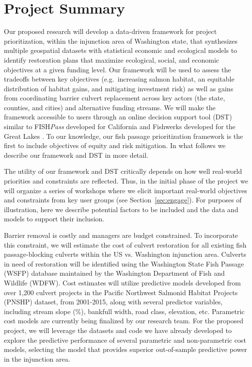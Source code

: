 \documentclass[12pt]{elsarticle}
\begin{document}
\section{Project Summary}\label{sec:summary} %

Our proposed research will develop a data-driven framework for project prioritization, within the injunction area of Washington state, that synthesizes multiple geospatial datasets with statistical economic and ecological models to identify restoration plans that maximize ecological, social, and economic objectives at a given funding level. Our framework will be used to assess the tradeoffs between key objectives (e.g.\ increasing salmon habitat, an equitable distribution of habitat gains, and mitigating investment risk) as well as gains from coordinating barrier culvert replacement across key actors (the state, counties, and cities) and alternative funding streams. We will make the framework accessible to users through an online decision support tool (DST) similar to FISH\emph{Pass} developed for California \citep{optipass2015migratory} and Fishwerks developed for the Great Lakes \citep{moody2017pet}. To our knowledge, our fish passage prioritization framework is the first to include objectives of equity and risk mitigation. In what follows we describe our framework and DST in more detail.

The utility of our framework and DST critically depends on how well real-world priorities and constraints are reflected. Thus, in the initial phase of the project we will organize a series of workshops where we elicit important real-world objectives and constraints from key user groups (see Section~\ref{sec:engage}). For purposes of illustration, here we describe potential factors to be included and the data and models to support their inclusion.   

Barrier removal is costly and managers are budget constrained. To incorporate this constraint, we will estimate the cost of culvert restoration for all existing fish passage-blocking culverts within the US vs. Washington injunction area. Culverts in need of restoration will be identified using the Washington State Fish Passage (WSFP) database maintained by the Washington Department of Fish and Wildlife (WDFW). Cost estimates will utilize predictive models developed from over 1,200 culvert projects in the Pacific Northwest Salmonid Habitat Projects (PNSHP) dataset, from 2001-2015, along with several predictor variables, including stream slope (\%), bankfull width, road class, elevation, etc. Parametric cost models are currently being finalized by our research team. For the proposed project, we will leverage the datasets and code we have already developed to explore the predictive performance of several parametric and non-parametric cost models, selecting the model that provides superior out-of-sample predictive power in the injunction area.
\end{document}
